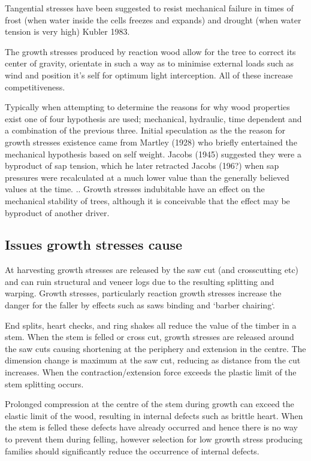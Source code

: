 \documentclass{article}
\begin{document}
Tangential stresses have been suggested to resist mechanical failure in times of
frost (when water inside the cells freezes and expands) and drought (when water
tension is very high) Kubler 1983.

The growth stresses produced by reaction wood allow for the tree to correct its
center of gravity, orientate in such a way as to minimise external loads such as
wind and position it's self for optimum light interception. All of these
increase competitiveness.

Typically when attempting to determine the reasons for why wood properties exist
one of four hypothesis are used; mechanical, hydraulic, time dependent and a
combination of the previous three. Initial speculation as the the reason for
growth stresses existence came from Martley (1928) who briefly entertained the
mechanical hypothesis based on self weight. Jacobs (1945) suggested they were a
byproduct of sap tension, which he later retracted Jacobs (196?) when sap
pressures were recalculated at a much lower value than the generally believed
values at the time. .. Growth stresses indubitable have an effect on the
mechanical stability of trees, although it is conceivable that the effect may be
byproduct of another driver.


\subsection{Issues growth stresses cause }

At harvesting growth stresses are released by the saw cut (and crosscutting etc)
and can ruin structural and veneer logs due to the resulting splitting and
warping. Growth stresses, particularly reaction growth stresses increase the
danger for the faller by effects such as saws binding and `barber chairing`.

End splits, heart checks, and ring shakes all reduce the value of the timber in
a stem. When the stem is felled or cross cut, growth stresses are released
around the saw cuts causing shortening at the periphery and extension in the
centre. The dimension change is maximum at the saw cut, reducing as distance
from the cut increases. When the contraction/extension force exceeds the plastic
limit of the stem splitting occurs.

Prolonged compression at the centre of the stem during growth can exceed the
elastic limit of the wood, resulting in internal defects such as brittle heart.
When the stem is felled these defects have already occurred and hence there is
no way to prevent them during felling, however selection for low growth stress
producing families should significantly reduce the occurrence of internal
defects.
\end{document}
